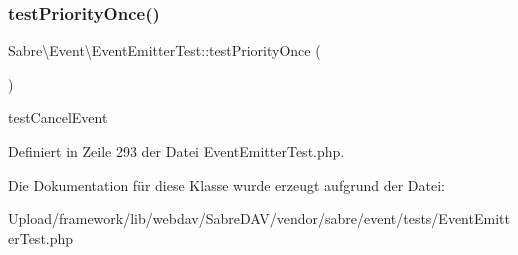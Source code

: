 \subsubsection{\texorpdfstring{test\+Priority\+Once()}{testPriorityOnce()}}
{\footnotesize\ttfamily Sabre\textbackslash{}\+Event\textbackslash{}\+Event\+Emitter\+Test\+::test\+Priority\+Once (\begin{DoxyParamCaption}{ }\end{DoxyParamCaption})}

test\+Cancel\+Event 

Definiert in Zeile 293 der Datei Event\+Emitter\+Test.\+php.



Die Dokumentation für diese Klasse wurde erzeugt aufgrund der Datei\+:\begin{DoxyCompactItemize}
\item 
Upload/framework/lib/webdav/\+Sabre\+D\+A\+V/vendor/sabre/event/tests/Event\+Emitter\+Test.\+php\end{DoxyCompactItemize}
